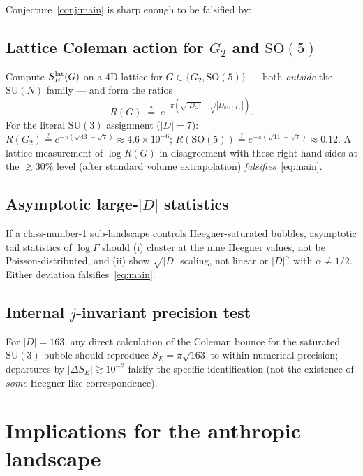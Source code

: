 \documentclass[11pt,a4paper]{article}
\theoremstyle{plain}
\theoremstyle{definition}
\newcommand{\SU}{\mathrm{SU}}
\newcommand{\SO}{\mathrm{SO}}
\begin{document}
Conjecture~\ref{conj:main} is sharp enough to be falsified by:

\subsection{Lattice Coleman action for $G_2$ and $\SO(5)$}
Compute $S_E^{\rm lat}(G)$ on a 4D lattice for $G\in\{G_2,\SO(5)\}$ --- both \emph{outside} the $\SU(N)$ family --- and form the ratios
\[
R(G) \;\stackrel{?}{=}\; e^{-\pi(\sqrt{|D_G|}-\sqrt{|D_{\SU(3)}|})}.
\]
For the literal $\SU(3)$ assignment ($|D|=7$): $R(G_2)\stackrel{?}{=}e^{-\pi(\sqrt{43}-\sqrt{7})}\approx 4.6\times 10^{-6}$; $R(\SO(5))\stackrel{?}{=}e^{-\pi(\sqrt{11}-\sqrt{7})}\approx 0.12$. A lattice measurement of $\log R(G)$ in disagreement with these right-hand-sides at the $\gtrsim 30\%$ level (after standard volume extrapolation) \emph{falsifies}~\eqref{eq:main}.

\subsection{Asymptotic large-$|D|$ statistics}
If a class-number-1 sub-landscape controls Heegner-saturated bubbles, asymptotic tail statistics of $\log\Gamma$ should (i) cluster at the nine Heegner values, not be Poisson-distributed, and (ii) show $\sqrt{|D|}$ scaling, not linear or $|D|^\alpha$ with $\alpha\ne 1/2$. Either deviation falsifies~\eqref{eq:main}.

\subsection{Internal $j$-invariant precision test}
For $|D|=163$, any direct calculation of the Coleman bounce for the saturated $\SU(3)$ bubble should reproduce $S_E=\pi\sqrt{163}$ to within numerical precision; departures by $|\Delta S_E|\gtrsim 10^{-2}$ falsify the specific identification (not the existence of \emph{some} Heegner-like correspondence).

\section{Implications for the anthropic landscape}\label{sec:anthropic}
\end{document}

